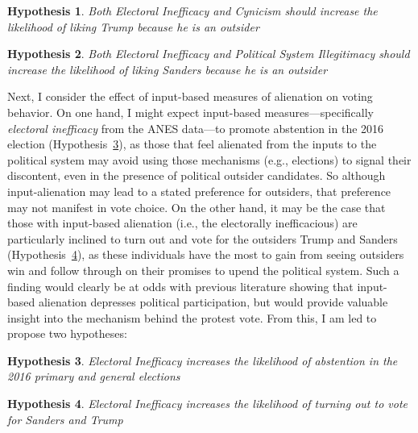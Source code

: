 \documentclass[12pt]{article}
\makeatletter
\newtheorem{hyp}{Hypothesis}
\newcounter{subhyp}
\newenvironment{subhyp}
 {%
  \setcounter{subhyp}{0}%
  \stepcounter{hyp}%
  \edef\saved@hyp{\thehyp}%
  \let\c@hyp\c@subhyp     %
  \renewcommand{\thehyp}{\saved@hyp\alph{hyp}}%
 }
 {}
\makeatother
\begin{document}
\begin{hyp}\label{hyp:candevals-trump}
Both Electoral Inefficacy and Cynicism should increase the likelihood of liking Trump because he is an outsider
\end{hyp}

\begin{hyp}\label{hyp:candevals-sanders}
Both Electoral Inefficacy and Political System Illegitimacy should increase the likelihood of liking Sanders because he is an outsider
\end{hyp}


Next, I consider the effect of input-based measures of alienation on voting behavior. On one hand, I might expect input-based measures---specifically \textit{electoral inefficacy} from the ANES data---to promote abstention in the 2016 election (Hypothesis~\ref{hyp:input-abstain}), as those that feel alienated from the inputs to the political system may avoid using those mechanisms (e.g., elections) to signal their discontent, even in the presence of political outsider candidates. So although input-alienation may lead to a stated preference for outsiders, that preference may not manifest in vote choice. On the other hand, it may be the case that those with input-based alienation (i.e., the electorally inefficacious) are particularly inclined to turn out and vote for the outsiders Trump and Sanders (Hypothesis~\ref{hyp:input-vote}), as these individuals have the most to gain from seeing outsiders win and follow through on their promises to upend the political system. Such a finding would clearly be at odds with previous literature showing that input-based alienation depresses political participation, but would provide valuable insight into the mechanism behind the protest vote. From this, I am led to propose two hypotheses:

\begin{subhyp}
\begin{hyp}\label{hyp:input-abstain}
	Electoral Inefficacy increases the likelihood of abstention in the 2016 primary and general elections
\end{hyp}
%	
\begin{hyp}\label{hyp:input-vote}
	Electoral Inefficacy increases the likelihood of turning out to vote for Sanders and Trump
\end{hyp}	
\end{subhyp}
\end{document}

